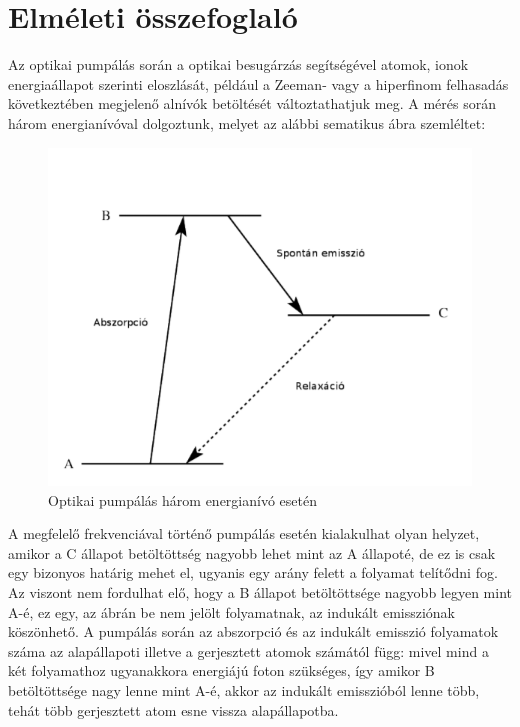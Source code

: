 \documentclass[12pt,a4paper]{article}
\begin{document}
\section{Elméleti összefoglaló}
 \hspace*{10pt} Az optikai pumpálás során a optikai besugárzás segítségével atomok, ionok energiaállapot szerinti eloszlását, például a Zeeman- vagy a hiperfinom felhasadás következtében megjelenő alnívók betöltését változtathatjuk meg. A mérés során három energianívóval dolgoztunk, melyet az alábbi sematikus ábra szemléltet:
\begin{figure}[!h]
\centering
\includegraphics[scale=0.5]{nivok.png}
\caption{Optikai pumpálás három energianívó esetén}
\end{figure}
\newline
A megfelelő frekvenciával történő pumpálás esetén kialakulhat olyan helyzet, amikor a C állapot betöltöttség nagyobb lehet mint az A állapoté, de ez is csak egy bizonyos határig mehet el, ugyanis egy arány felett a folyamat telítődni fog. Az viszont nem fordulhat elő, hogy a B állapot betöltöttsége nagyobb legyen mint A-é, ez egy, az ábrán be nem jelölt folyamatnak, az indukált emissziónak köszönhető. A pumpálás során az abszorpció és az indukált emisszió folyamatok száma az alapállapoti illetve a gerjesztett atomok számától függ: mivel mind a két folyamathoz ugyanakkora energiájú foton szükséges, így amikor B betöltöttsége nagy lenne mint A-é, akkor az indukált emisszióból lenne több, tehát több gerjesztett atom esne vissza alapállapotba.\\
\end{document}

